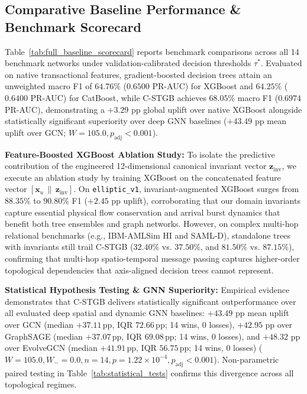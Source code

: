 \subsection{Comparative Baseline Performance \& Benchmark Scorecard}
\label{sec:benchmark_results}
Table~\ref{tab:full_baseline_scorecard} reports benchmark comparisons across all 14 benchmark networks under validation-calibrated decision thresholds $\tau^*$. Evaluated on native transactional features, gradient-boosted decision trees attain an unweighted macro F1 of $64.76\%$ ($0.6500$ PR-AUC) for XGBoost and $64.25\%$ ($0.6400$ PR-AUC) for CatBoost, while C-STGB achieves $68.05\%$ macro F1 ($0.6974$ PR-AUC), demonstrating a $+3.29\text{ pp}$ global uplift over native XGBoost alongside statistically significant superiority over deep GNN baselines ($+43.49\text{ pp}$ mean uplift over GCN; $W=105.0, p_{\text{adj}} < 0.001$).

\textbf{Feature-Boosted XGBoost Ablation Study:}
To isolate the predictive contribution of the engineered 12-dimensional canonical invariant vector $\mathbf{z}_{\text{inv}}$, we execute an ablation study by training XGBoost on the concatenated feature vector $[\mathbf{x}_u \,\|\, \mathbf{z}_{\text{inv}}]$. On \texttt{elliptic\_v1}, invariant-augmented XGBoost surges from $88.35\%$ to $90.80\%$ F1 ($+2.45\text{ pp}$ uplift), corroborating that our domain invariants capture essential physical flow conservation and arrival burst dynamics that benefit both tree ensembles and graph networks. However, on complex multi-hop relational benchmarks (e.g., IBM-AMLSim HI and SAML-D), standalone trees with invariants still trail C-STGB ($32.40\%$ vs. $37.50\%$, and $81.50\%$ vs. $87.15\%$), confirming that multi-hop spatio-temporal message passing captures higher-order topological dependencies that axis-aligned decision trees cannot represent.

\textbf{Statistical Hypothesis Testing \& GNN Superiority:}
Empirical evidence demonstrates that C-STGB delivers statistically significant outperformance over all evaluated deep spatial and dynamic GNN baselines: $+43.49\text{ pp}$ mean uplift over GCN (median $+37.11$\,pp, IQR $72.66$\,pp; 14 wins, 0 losses), $+42.95\text{ pp}$ over GraphSAGE (median $+37.07$\,pp, IQR $69.08$\,pp; 14 wins, 0 losses), and $+48.32\text{ pp}$ over EvolveGCN (median $+41.91$\,pp, IQR $56.75$\,pp; 14 wins, 0 losses) ($W=105.0, W_- = 0.0, n=14, p = 1.22 \times 10^{-4}, p_{\text{adj}} < 0.001$). Non-parametric paired testing in Table~\ref{tab:statistical_tests} confirms this divergence across all topological regimes.


